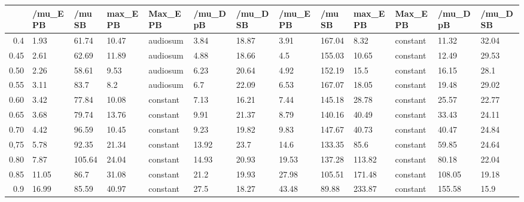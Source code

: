 \begin{table}[ht]
\centering
\begin{tabular}{rllllllllllll}
  \hline
 & /mu\_E PB & /mu SB & max\_E PB & Max\_E PB & /mu\_D pB & /mu\_D SB & /mu\_E PB & /mu SB & max\_E PB & Max\_E PB & /mu\_D pB & /mu\_D SB \\ 
  \hline
0.4 & 1.93 & 61.74 & 10.47 & audiosum & 3.84 & 18.87 & 3.91 & 167.04 & 8.32 & constant & 11.32 & 32.04 \\ 
  0.45 & 2.61 & 62.69 & 11.89 & audiosum & 4.88 & 18.66 & 4.5 & 155.03 & 10.65 & constant & 12.49 & 29.53 \\ 
  0.50 & 2.26 & 58.61 & 9.53 & audiosum & 6.23 & 20.64 & 4.92 & 152.19 & 15.5 & constant & 16.15 & 28.1 \\ 
  0.55 & 3.11 & 83.7 & 8.2 & audiosum & 6.7 & 22.09 & 6.53 & 167.07 & 18.05 & constant & 19.48 & 29.02 \\ 
  0.60 & 3.42 & 77.84 & 10.08 & constant & 7.13 & 16.21 & 7.44 & 145.18 & 28.78 & constant & 25.57 & 22.77 \\ 
  0.65 & 3.68 & 79.74 & 13.76 & constant & 9.91 & 21.37 & 8.79 & 140.16 & 40.49 & constant & 33.43 & 24.11 \\ 
  0.70 & 4.42 & 96.59 & 10.45 & constant & 9.23 & 19.82 & 9.83 & 147.67 & 40.73 & constant & 40.47 & 24.84 \\ 
  0,75 & 5.78 & 92.35 & 21.34 & constant & 13.92 & 23.7 & 14.6 & 133.35 & 85.6 & constant & 59.85 & 24.64 \\ 
  0.80 & 7.87 & 105.64 & 24.04 & constant & 14.93 & 20.93 & 19.53 & 137.28 & 113.82 & constant & 80.18 & 22.04 \\ 
  0.85 & 11.05 & 86.7 & 31.08 & constant & 21.2 & 19.93 & 27.98 & 105.51 & 171.48 & constant & 108.05 & 19.18 \\ 
  0.9 & 16.99 & 85.59 & 40.97 & constant & 27.5 & 18.27 & 43.48 & 89.88 & 233.87 & constant & 155.58 & 15.9 \\ 
   \hline
\end{tabular}
\end{table}
